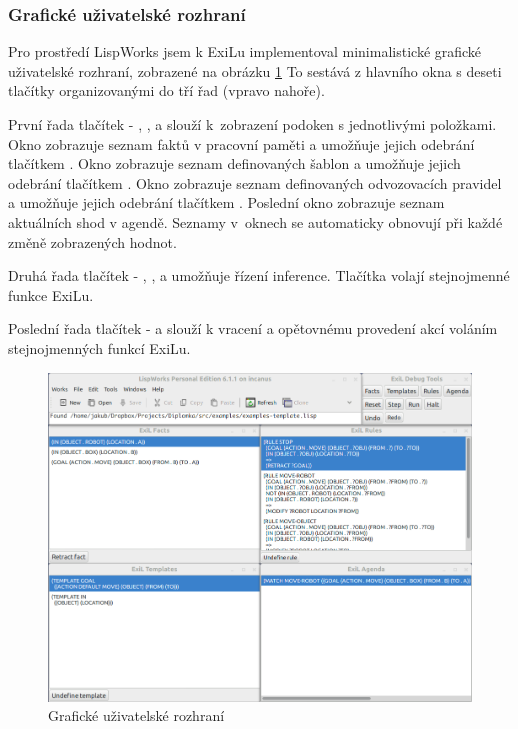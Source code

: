 \subsubsection{Grafické uživatelské rozhraní}

Pro prostředí LispWorks jsem k ExiLu implementoval minimalistické grafické
uživatelské rozhraní, zobrazené na obrázku \ref{gui} To sestává z hlavního okna
s deseti tlačítky organizovanými do tří řad (vpravo nahoře).

První řada tlačítek - , ,  a 
slouží k~zobrazení podoken s jednotlivými položkami. Okno  zobrazuje
seznam faktů v pracovní paměti a umožňuje jejich odebrání tlačítkem
. Okno  zobrazuje seznam definovaných šablon a
umožňuje jejich odebrání tlačítkem . Okno 
zobrazuje seznam definovaných odvozovacích pravidel a umožňuje jejich odebrání
tlačítkem . Poslední okno  zobrazuje seznam
aktuálních shod v agendě. Seznamy v~oknech se automaticky obnovují při každé
změně zobrazených hodnot.

Druhá řada tlačítek - , ,  a  umožňuje
řízení inference. Tlačítka volají stejnojmenné funkce ExiLu.

Poslední řada tlačítek -  a  slouží k vracení a opětovnému
provedení akcí voláním stejnojmenných funkcí ExiLu.

\begin{figure}[h]
\includegraphics[width=\textwidth]{exil-gui.png}
\caption{Grafické uživatelské rozhraní}
\label{gui}
\end{figure}
